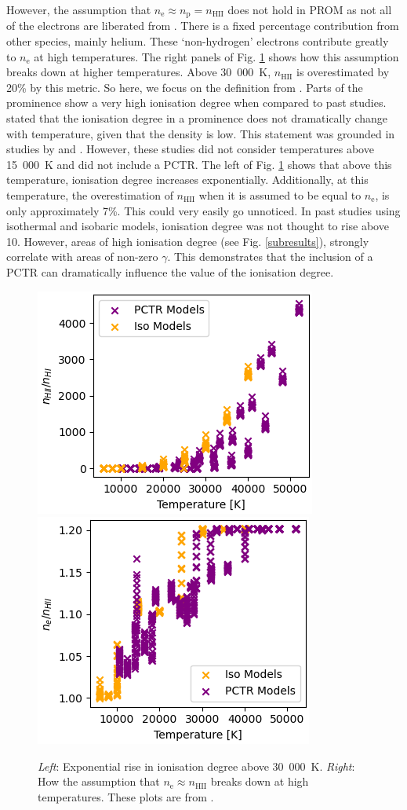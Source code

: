 However, the assumption that $n_\text{e}\approx n_\text{p}=n_\text{HII}$ does not hold in PROM as not all of the electrons are liberated from . There is a fixed percentage contribution from other species, mainly helium. These `non-hydrogen' electrons contribute greatly to $n_\text{e}$ at high temperatures. The right panels of Fig. \ref{iondeg} shows how this assumption breaks down at higher temperatures. Above 30~000~K, $n_\text{HII}$ is overestimated by 20\% by this metric. So here, we focus on the definition from \cite{tandberg-hanssen_nature_1995}. Parts of the prominence show a very high ionisation degree when compared to past studies. \cite{vial_solar_1998} stated that the ionisation degree in a prominence does not dramatically change with temperature, given that the density is low. This statement was grounded in studies by \cite{gouttebroze_hydrogen_1993} and \cite{heinzel_theoretical_1994}. However, these studies did not consider temperatures above 15~000~K and did not include a PCTR. The left of Fig. \ref{iondeg} shows that above this temperature, ionisation degree increases exponentially. Additionally, at this temperature, the overestimation of $n_\text{HII}$ when it is assumed to be equal to $n_\text{e}$, is only approximately 7\%. This could very easily go unnoticed. In past studies using isothermal and isobaric models, ionisation degree was not thought to rise above 10. However, areas of high ionisation degree (see Fig. \ref{subresults}), strongly correlate with areas of non-zero $\gamma$. This demonstrates that the inclusion of a PCTR can dramatically influence the value of the ionisation degree.



\begin{figure}
    \centering
    \includegraphics*[width=0.4\linewidth]{./02Modelling1D/figs/20180419/ideg_temp_new.png}
    \includegraphics*[width=0.4\linewidth]{./02Modelling1D/figs/20180419/excess_electrons.png}
    \caption[Exponential rise in ionisation degree above 30~000~K and how the assumption that $n_\text{e}\approx n_\text{HII}$ breaks down at high temperatures.]{\textit{Left}: Exponential rise in ionisation degree above 30~000~K. \textit{Right}: How the assumption that $n_\text{e}\approx n_\text{HII}$ breaks down at high temperatures. These plots are from \cite{peat_solar_2021}.}
    \label{iondeg}
\end{figure}

